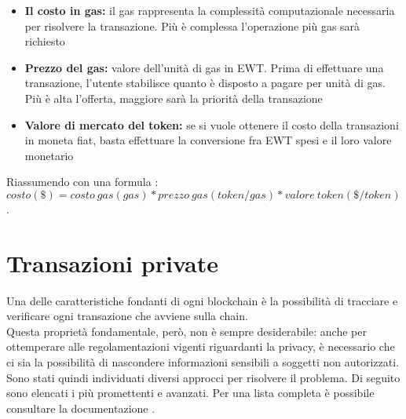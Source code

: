 \begin{itemize}
    \item \textbf{Il costo in gas:} il gas rappresenta la complessità computazionale necessaria per risolvere la transazione. Più è complessa l'operazione più gas sarà richiesto
    \item \textbf{Prezzo del gas:} valore dell'unità di gas in EWT. Prima di effettuare una transazione, l'utente stabilisce quanto è disposto a pagare per unità di gas. Più è alta l'offerta, maggiore sarà la priorità della transazione
    \item \textbf{Valore di mercato del token:} se si vuole ottenere il costo della transazioni in moneta fiat, basta effettuare la conversione fra EWT spesi e il loro valore monetario
\end{itemize}

Riassumendo con una formula \cite{wiki:ew-transaction-cost}: \\
$ costo(\$) = costo\ gas(gas) * prezzo\ gas(token/gas) * valore\ token (\$/token) $.


\section{Transazioni private}
Una delle caratteristiche fondanti di ogni blockchain è la possibilità di tracciare e verificare ogni transazione che avviene sulla chain. \\
Questa proprietà fondamentale, però, non è sempre desiderabile: anche per ottemperare alle regolamentazioni vigenti riguardanti la privacy, è necessario che ci sia la possibilità di nascondere informazioni sensibili a soggetti non autorizzati. \\
Sono stati quindi individuati diversi approcci per risolvere il problema.
Di seguito sono elencati i più promettenti e avanzati.
Per una lista completa è possibile consultare la documentazione \cite{wiki:ew-privacy}.

